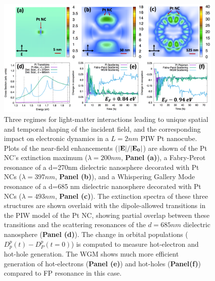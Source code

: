 \documentclass[journal=jpclcd,manuscript=article]{achemso}
\begin{document}
\begin{figure}
\begin{center}
\includegraphics[width=6in]{Pt_AllThree_Alternate.png}
\caption{Three regimes for light-matter interactions leading to unique
spatial and temporal shaping of the incident field, and the corresponding
impact on electronic dynamics in a $L=2nm$ PIW Pt nanocube. Plots of the near-field enhancements (${\bf |E|}/{\bf |E_0|}$) are shown of the
Pt NC's extinction maximum ($\lambda=200 nm$, {\bf Panel (a)}), a Fabry-Perot resonance of a d=270nm dielectric nanosphere decorated with Pt NCs
($\lambda = 397 nm$, {\bf Panel (b)}),
and a Whispering Gallery Mode resonance of a d=685 nm dielectric nanosphere decorated with Pt NCs ($\lambda = 493 nm$, {\bf Panel (c)}).
The extinction spectra of these three structures are shown overlaid with the dipole-allowed transitions in the PIW model of the Pt NC, showing partial
overlap between these transitions and the scattering resonances of the $d=685 nm$ dielectric nanosphere ({\bf Panel (d)}).
The change in orbital populations ($D_p^p(t)-D_P^p(t=0)$) is computed to measure hot-electron and hot-hole generation.
The WGM shows much more efficient generation of hot-electrons ({\bf Panel (e)}) and hot-holes ({\bf Panel(f)}) compared to FP resonance in this case.}
\end{center}
\end{figure}
\end{document}
